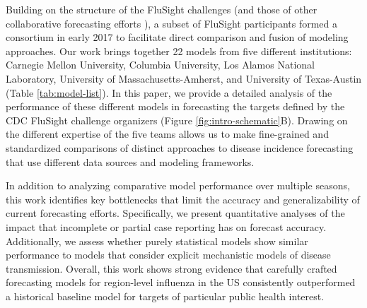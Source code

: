 \documentclass{article}\usepackage[]{graphicx}\usepackage[]{color}
\begin{document}
Building on the structure of the FluSight challenges (and those of other collaborative forecasting efforts \cite{Smith2017,Viboud2017}), a subset of FluSight participants formed a consortium in early 2017 to facilitate direct comparison and fusion of modeling approaches. 
Our work brings together 22 models from five different institutions: Carnegie Mellon University, Columbia University, Los Alamos National Laboratory, University of Massachusetts-Amherst, and University of Texas-Austin (Table \ref{tab:model-list}).
In this paper, we provide a detailed analysis of the performance of these different models in forecasting the targets defined by the CDC FluSight challenge organizers (Figure \ref{fig:intro-schematic}B).
Drawing on the different expertise of the five teams allows us to make fine-grained and standardized comparisons of distinct approaches to disease incidence forecasting that use different data sources and modeling frameworks.

In addition to analyzing comparative model performance over multiple seasons, this work identifies key bottlenecks that limit the accuracy and generalizability of current forecasting efforts.
Specifically, we present quantitative analyses of the impact that incomplete or partial case reporting has on forecast accuracy.
Additionally, we assess whether purely statistical models show similar performance to models that consider explicit mechanistic models of disease transmission.
Overall, this work shows strong evidence that carefully crafted forecasting models for region-level influenza in the US consistently outperformed a historical baseline model for targets of particular public health interest. 
\end{document}
